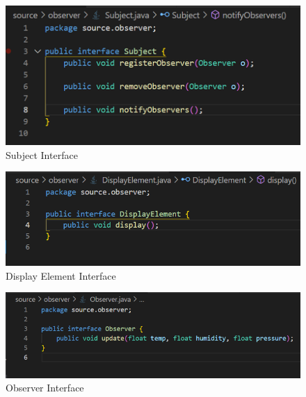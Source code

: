 \begin{figure}[!htb]
    \centering
    \includegraphics[width=\textwidth]{fig/Observer/subject_class.png}
    \caption{Subject Interface}
    \label{fig:subject_class}
\end{figure}
\begin{figure}[!htb]
    \centering
    \includegraphics[width=\textwidth]{fig/Observer/display_element_class.png}
    \caption{Display Element Interface}
    \label{fig:display_element_class}
\end{figure}
\newpage
\begin{figure}[!htb]
    \centering
    \includegraphics[width=\textwidth]{fig/Observer/observer_class.png}
    \caption{Observer Interface}
    \label{fig:observer_class}
\end{figure}



